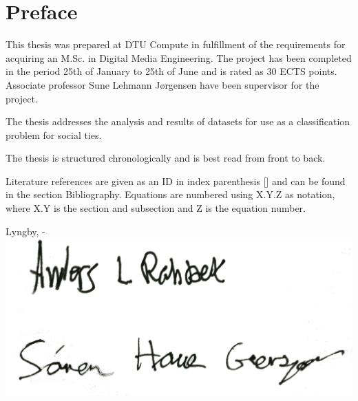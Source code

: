 \chapter{Preface}
This thesis was prepared at DTU Compute in fulfillment of the requirements for acquiring an M.Sc. in Digital Media Engineering.
The project has been completed in the period 25th of January to 25th of June and is rated as 30 ECTS points. Associate professor Sune Lehmann Jørgensen have been supervisor for the project.

The thesis addresses the analysis and results of datasets for use as a classification problem for social ties.

The thesis is structured chronologically and is best read from front to back.

Literature references are given as an ID in index parenthesis [] and can be found in the section Bibliography.
Equations are numbered using X.Y.Z as notation, where X.Y is the section and subsection and Z is the equation number.

\vspace{12mm}
\begin{center}
    \hspace{20mm} Lyngby, \thesishandin-\thesisyear
    \vspace{2mm}
    \newline
    \includegraphics[scale=0.05]{figures/signature}
\end{center}
\begin{flushright}
    \thesisauthor
\end{flushright}
